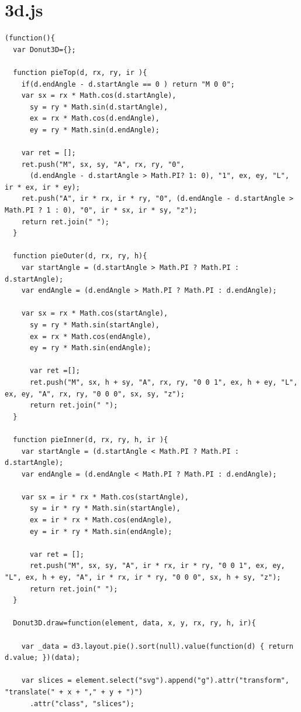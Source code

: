 \documentclass[a4paper,14pt]{extreport}
\begin{document}
\section*{3d.js}
\begin{lstlisting}
(function(){
  var Donut3D={};
  
  function pieTop(d, rx, ry, ir ){
    if(d.endAngle - d.startAngle == 0 ) return "M 0 0";
    var sx = rx * Math.cos(d.startAngle),
      sy = ry * Math.sin(d.startAngle),
      ex = rx * Math.cos(d.endAngle),
      ey = ry * Math.sin(d.endAngle);
      
    var ret = [];
    ret.push("M", sx, sy, "A", rx, ry, "0",
      (d.endAngle - d.startAngle > Math.PI? 1: 0), "1", ex, ey, "L", ir * ex, ir * ey);
    ret.push("A", ir * rx, ir * ry, "0", (d.endAngle - d.startAngle > Math.PI ? 1 : 0), "0", ir * sx, ir * sy, "z");
    return ret.join(" ");
  }

  function pieOuter(d, rx, ry, h){
    var startAngle = (d.startAngle > Math.PI ? Math.PI : d.startAngle);
    var endAngle = (d.endAngle > Math.PI ? Math.PI : d.endAngle);
    
    var sx = rx * Math.cos(startAngle),
      sy = ry * Math.sin(startAngle),
      ex = rx * Math.cos(endAngle),
      ey = ry * Math.sin(endAngle);
      
      var ret =[];
      ret.push("M", sx, h + sy, "A", rx, ry, "0 0 1", ex, h + ey, "L", ex, ey, "A", rx, ry, "0 0 0", sx, sy, "z");
      return ret.join(" ");
  }

  function pieInner(d, rx, ry, h, ir ){
    var startAngle = (d.startAngle < Math.PI ? Math.PI : d.startAngle);
    var endAngle = (d.endAngle < Math.PI ? Math.PI : d.endAngle);
    
    var sx = ir * rx * Math.cos(startAngle),
      sy = ir * ry * Math.sin(startAngle),
      ex = ir * rx * Math.cos(endAngle),
      ey = ir * ry * Math.sin(endAngle);

      var ret = [];
      ret.push("M", sx, sy, "A", ir * rx, ir * ry, "0 0 1", ex, ey, "L", ex, h + ey, "A", ir * rx, ir * ry, "0 0 0", sx, h + sy, "z");
      return ret.join(" ");
  }
  
  Donut3D.draw=function(element, data, x, y, rx, ry, h, ir){
  
    var _data = d3.layout.pie().sort(null).value(function(d) { return d.value; })(data);
    
    var slices = element.select("svg").append("g").attr("transform", "translate(" + x + "," + y + ")")
      .attr("class", "slices");


\end{lstlisting}
\end{document}
